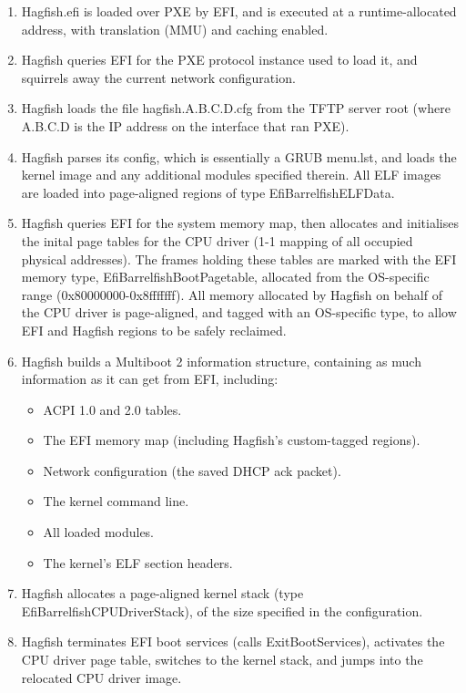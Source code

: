 \documentclass[a4paper,twoside]{report}
\begin{document}
\begin{enumerate}
\item Hagfish.efi is loaded over PXE by EFI, and is executed at a
runtime-allocated address, with translation (MMU) and caching enabled.
\item Hagfish queries EFI for the PXE protocol instance used to load it, and
squirrels away the current network configuration.
\item Hagfish loads the file hagfish.A.B.C.D.cfg from the TFTP server root
(where A.B.C.D is the IP address on the interface that ran PXE).
\item Hagfish parses its config, which is essentially a GRUB menu.lst, and
loads the kernel image and any additional modules specified therein. All ELF
images are loaded into page-aligned regions of type EfiBarrelfishELFData.
\item Hagfish queries EFI for the system memory map, then allocates and
initialises the inital page tables for the CPU driver (1-1 mapping of all
occupied physical addresses). The frames holding these tables are marked with
the EFI memory type, EfiBarrelfishBootPagetable, allocated from the
OS-specific range (0x80000000-0x8fffffff). All memory allocated by Hagfish on
behalf of the CPU driver is page-aligned, and tagged with an OS-specific type,
to allow EFI and Hagfish regions to be safely reclaimed.
\item Hagfish builds a Multiboot 2 information structure, containing as much
information as it can get from EFI, including:
    \begin{itemize}
    \item ACPI 1.0 and 2.0 tables.
    \item The EFI memory map (including Hagfish's custom-tagged regions).
    \item Network configuration (the saved DHCP ack packet).
    \item The kernel command line.
    \item All loaded modules.
    \item The kernel's ELF section headers.
    \end{itemize}
\item Hagfish allocates a page-aligned kernel stack (type
EfiBarrelfishCPUDriverStack), of the size specified in the configuration.
\item Hagfish terminates EFI boot services (calls ExitBootServices), activates
the CPU driver page table, switches to the kernel stack, and jumps into the
relocated CPU driver image.
\end{enumerate}
\end{document}
